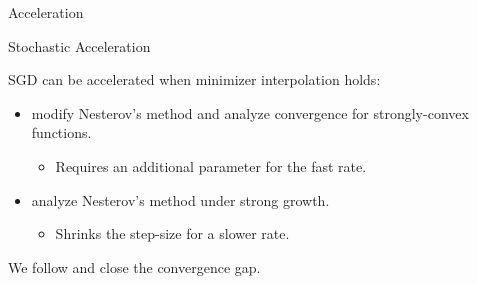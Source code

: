 \documentclass[mathserif,notheorems, hyperref={colorlinks, citecolor=blue, urlcolor=blue, linkcolor=blue}]{beamer}
\def\\{}%
\begin{document}

\begin{frame}
	\begin{center}
		\huge Acceleration \\
	\end{center}
\end{frame}




\begin{frame}{Stochastic Acceleration}

	SGD can be accelerated when minimizer interpolation holds:
	\vspace{2ex}
	\begin{itemize}
		\item \citet{liu2020accelerating} modify Nesterov's method and analyze convergence for strongly-convex functions.
		      \vspace{1ex}
		      \begin{itemize}
			      \item Requires an additional parameter for the fast rate.
		      \end{itemize}
		      \vspace{2ex}
		      \pause
		\item \citet{vaswani2019fast} analyze Nesterov's method under strong growth.
		      \vspace{1ex}
		      \begin{itemize}
			      \item Shrinks the step-size for a slower rate.
		      \end{itemize}
	\end{itemize}

	\vspace{3ex}
	\pause

	We follow \citet{vaswani2019fast} and close the convergence gap.

\end{frame}
\end{document}
